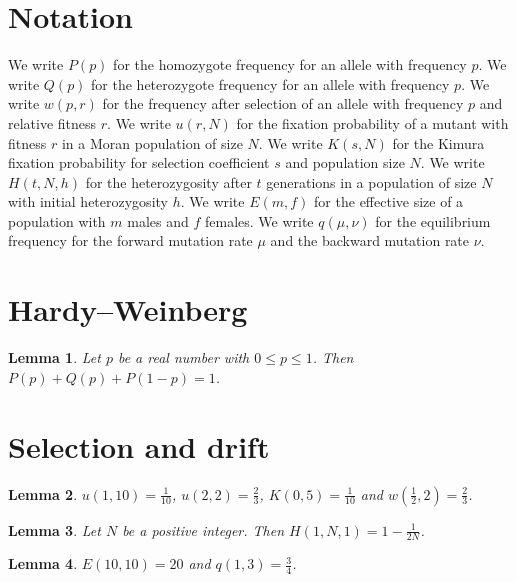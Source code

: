 \documentclass{article}
\newtheorem{lemma}{Lemma}
\begin{document}
\section{Notation}

We write $P(p)$ for the homozygote frequency for an allele with frequency $p$.
We write $Q(p)$ for the heterozygote frequency for an allele with frequency $p$.
We write $w(p,r)$ for the frequency after selection of an allele with frequency $p$ and relative fitness $r$.
We write $u(r,N)$ for the fixation probability of a mutant with fitness $r$ in a Moran population of size $N$.
We write $K(s,N)$ for the Kimura fixation probability for selection coefficient $s$ and population size $N$.
We write $H(t,N,h)$ for the heterozygosity after $t$ generations in a population of size $N$ with initial heterozygosity $h$.
We write $E(m,f)$ for the effective size of a population with $m$ males and $f$ females.
We write $q(\mu,\nu)$ for the equilibrium frequency for the forward mutation rate $\mu$ and the backward mutation rate $\nu$.

\section{Hardy--Weinberg}

\begin{lemma}\label{hardy}
Let $p$ be a real number with $0\le p\le1$. Then $P(p)+Q(p)+P(1-p)=1$.
\end{lemma}

\section{Selection and drift}

\begin{lemma}\label{fixation}
$u(1,10)=\frac1{10}$, $u(2,2)=\frac23$, $K(0,5)=\frac1{10}$ and $w(\frac12,2)=\frac23$.
\end{lemma}

\begin{lemma}\label{drift}
Let $N$ be a positive integer. Then $H(1,N,1)=1-\frac{1}{2N}$.
\end{lemma}

\begin{lemma}\label{sizes}
$E(10,10)=20$ and $q(1,3)=\frac34$.
\end{lemma}
\end{document}
